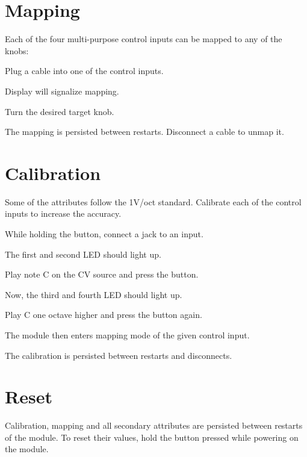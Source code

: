 \documentclass[11pt]{article}
\newenvironment{packed_enumerate}{
\begin{enumerate}
  \setlength{\itemsep}{1pt}
  \setlength{\parskip}{0pt}
  \setlength{\parsep}{0pt}
}{\end{enumerate}}
\begin{document}
\begin{minipage}{0.05\textwidth}
\phantom{ }
\end{minipage}%
\begin{minipage}[t]{0.45\textwidth}
\setlength{\parskip}{6pt}

\section{Mapping}

Each of the four multi-purpose control inputs can be mapped to any of the knobs:

\begin{packed_enumerate}
  \item Plug a cable into one of the control inputs.
  \item Display will signalize mapping.
  \item Turn the desired target knob.
\end{packed_enumerate}

The mapping is persisted between restarts. Disconnect a cable to unmap it.

\vspace{1.3cm}

\section{Calibration}

Some of the attributes follow the 1V/oct standard. Calibrate each of the control
inputs to increase the accuracy.

\begin{packed_enumerate}
  \item While holding the button, connect a jack to an input.
  \item The first and second LED should light up.
  \item Play note C on the CV source and press the button.
  \item Now, the third and fourth LED should light up.
  \item Play C one octave higher and press the button again.
\end{packed_enumerate}

The module then enters mapping mode of the given control input.

The calibration is persisted between restarts and disconnects.

\vspace{1.3cm}

\section{Reset}

Calibration, mapping and all secondary attributes are persisted between restarts
of the module. To reset their values, hold the button pressed while powering on
the module.

\end{minipage}
\end{document}
